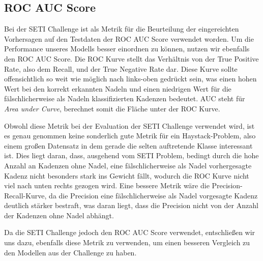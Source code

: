 \documentclass[12pt, a4paper]{article}
\begin{document}
\subsection{ROC AUC Score}
Bei der SETI Challenge ist als Metrik für die Beurteilung der eingereichten Vorhersagen auf den Testdaten der ROC AUC Score verwendet worden. Um die Performance unseres Modells besser einordnen zu können, nutzen wir ebenfalls den ROC AUC Score. Die ROC Kurve stellt das Verhältnis von der True Positive Rate, also dem Recall, und der True Negative Rate dar. Diese Kurve sollte offensichtlich so weit wie möglich nach links-oben gedrückt sein, was einen hohen Wert bei den korrekt erkannten Nadeln und einen niedrigen Wert für die fälschlicherweise als Nadeln klassifizierten Kadenzen bedeutet. AUC steht für \emph{Area under Curve}, berechnet somit die Fläche unter der ROC Kurve.

Obwohl diese Metrik bei der Evaluation der SETI Challenge verwendet wird, ist es genau genommen keine sonderlich gute Metrik für ein \glqq Haystack-Problem\grqq{}, also einem großen Datensatz in dem gerade die selten auftretende Klasse interessant ist. Dies liegt daran, dass, ausgehend vom SETI Problem, bedingt durch die hohe Anzahl an Kadenzen ohne Nadel, eine fälschlicherweise als Nadel vorhergesagte Kadenz nicht besonders stark ins Gewicht fällt, wodurch die ROC Kurve nicht viel nach unten rechts gezogen wird. Eine bessere Metrik wäre die Precision-Recall-Kurve, da die Precision eine fälschlicherweise als Nadel vorgesagte Kadenz deutlich stärker bestraft, was daran liegt, dass die Precision nicht von der Anzahl der Kadenzen ohne Nadel abhängt.

Da die SETI Challenge jedoch den ROC AUC Score verwendet, entschließen wir uns dazu, ebenfalls diese Metrik zu verwenden, um einen besseren Vergleich zu den Modellen aus der Challenge zu haben.
\end{document}

